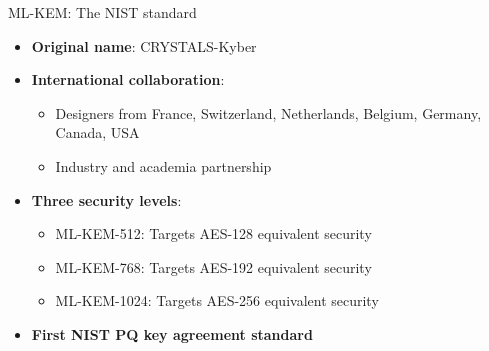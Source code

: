 \documentclass[aspectratio=169, lualatex, handout]{beamer}
\begin{document}
\begin{frame}{ML-KEM: The NIST standard}
	\begin{itemize}
		\item \textbf{Original name}: CRYSTALS-Kyber
		\item \textbf{International collaboration}:
		      \begin{itemize}
			      \item Designers from France, Switzerland, Netherlands, Belgium, Germany, Canada, USA
			      \item Industry and academia partnership
		      \end{itemize}
		\item \textbf{Three security levels}:
		      \begin{itemize}
			      \item ML-KEM-512: Targets AES-128 equivalent security
			      \item ML-KEM-768: Targets AES-192 equivalent security
			      \item ML-KEM-1024: Targets AES-256 equivalent security
		      \end{itemize}
		\item \textbf{First NIST PQ key agreement standard}
	\end{itemize}
\end{frame}
\end{document}
